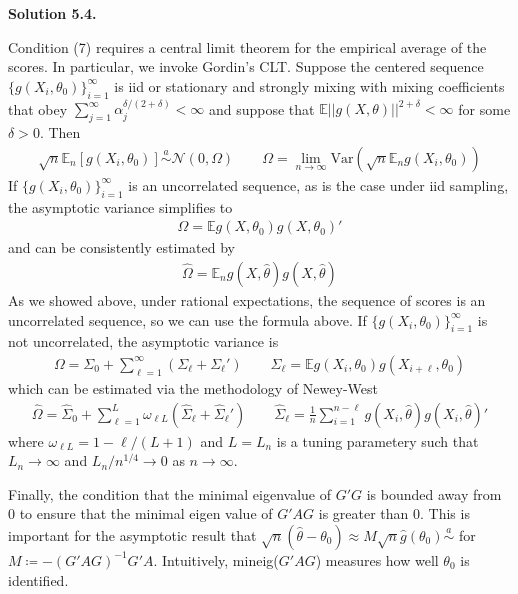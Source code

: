 \documentclass[11pt]{article}
\newenvironment{solution}[1]
    {\bigskip\noindent\textbf{Solution #1.} \par}
    {\medskip}
\newcommand{\ev}{\mathbb{E}}
\begin{document}
\begin{solution}{5.4}
Condition (7) requires a central limit theorem for the empirical average of the scores. In particular, we invoke Gordin's CLT. Suppose the centered sequence $\{g(X_i,\theta_0)\}_{i=1}^\infty$ is iid or stationary and strongly mixing with mixing coefficients that obey $\sum_{j=1}^{\infty}\alpha_j^{\delta/(2+\delta)} < \infty$ and suppose that $\ev||g(X,\theta) ||^{2+\delta} < \infty$ for some $\delta > 0.$ Then 
\begin{align*}
    \sqrt{n} \ev_n [g(X_i,\theta_0)] \overset{a}{\sim} \mathcal{N}(0,\Omega)\qquad \Omega = \lim_{n\to\infty} \text{Var}(\sqrt{n}\ev_ng(X_i,\theta_0))
\end{align*}
If $\{g(X_i,\theta_0)\}_{i=1}^\infty$ is an uncorrelated sequence, as is the case under iid sampling, the asymptotic variance simplifies to 
\begin{align*}
    \Omega = \ev g(X,\theta_0)g(X,\theta_0)'
\end{align*}
and can be consistently estimated by 
\begin{align*}
    \hat{\Omega} = \ev_n g(X,\hat{\theta})g(X,\hat{\theta})
\end{align*}
As we showed above, under rational expectations, the sequence of scores is an uncorrelated sequence, so we can use the formula above. If $\{g(X_i,\theta_0)\}_{i=1}^\infty$ is not uncorrelated, the asymptotic variance is 
\begin{align*}
    \Omega = \Sigma_{0} + \sum_{\ell=1}^{\infty}(\Sigma_\ell + \Sigma_\ell') \qquad \Sigma_\ell = \ev g(X_i,\theta_0)g(X_{i+\ell},\theta_0)
\end{align*}
which can be estimated via the methodology of Newey-West
\begin{align*}
    \hat{\Omega} = \hat{\Sigma}_0 + \sum_{\ell = 1}^L \omega_{\ell L}(\hat{\Sigma}_{\ell} + \hat{\Sigma}_{\ell}') \qquad \hat{\Sigma}_{\ell} = \frac{1}{n}\sum_{i=1}^{n - \ell}g(X_i,\hat{\theta})g(X_i,\hat{\theta})'
\end{align*}
where $\omega_{\ell L} = 1 - \ell/(L+1)$ and $L = L_n$ is a tuning parametery such that $L_n \to \infty$ and $L_n/n^{1/4} \to 0$ as $n\to\infty.$

Finally, the condition that the minimal eigenvalue of $G'G$ is bounded away from 0 to ensure that the minimal eigen value of $G'AG$ is greater than 0. This is important for the asymptotic result that $\sqrt{n}(\hat{\theta} - \theta_0) \approx M \sqrt{n} \hat{g}(\theta_0) \overset{a}{\sim}$ for $M \coloneq -(G'AG)^{-1}G'A.$ Intuitively, mineig($G'AG$) measures how well $\theta_0$ is identified.



\end{solution}
\end{document}
